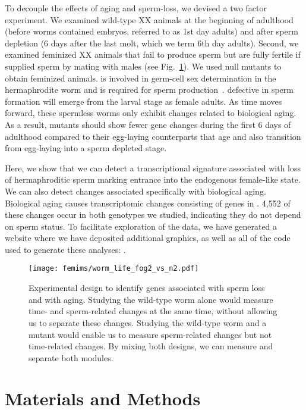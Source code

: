 To decouple the effects of aging and sperm-loss, we devised a two factor
experiment. We examined wild-type XX animals at the beginning of adulthood
(before worms contained embryos, referred to as 1st day adults) and after sperm
depletion (6 days after the last molt, which we term 6th day adults). Second, we
examined feminized XX animals that fail to produce sperm but are fully fertile
if supplied sperm by mating with males (see Fig.~\ref{fig:wormlife}). We used
 null mutants to obtain feminized animals.  is involved in
germ-cell sex determination in the hermaphrodite worm and is required for sperm
production~\citep{Schedl1988,Clifford2000}. \cel{} defective in sperm formation
will emerge from the larval stage as female adults. As time moves forward, these
spermless worms only exhibit changes related to biological aging. As a result,
\fog{} mutants should show fewer gene changes during the first 6 days of
adulthood compared to their egg-laying counterparts that age and also transition
from egg-laying into a sperm depleted stage.

Here, we show that we can detect a transcriptional signature associated
with loss of hermaphroditic sperm marking entrance into the endogenous
female-like state. We can also detect changes associated specifically with
biological aging. Biological aging causes transcriptomic changes consisting of
\agen{} genes in \cel{}. 4,552 of these changes occur in both genotypes we
studied, indicating they do not depend on sperm status. To facilitate
exploration of the data, we have generated a website where we have deposited
additional graphics, as well as all of the code used to generate these analyses:
\website{}.

\begin{figure}[htbp]
  \renewcommand{\familydefault}{\sfdefault}\normalfont{}
  \centering
  \texttt{[image: femims/worm\_life\_fog2\_vs\_n2.pdf]}
    \caption{
    Experimental design to identify genes associated with sperm loss and with
    aging. Studying the wild-type worm alone would measure time- and
    sperm-related changes at the same time, without allowing us to separate
    these changes. Studying the wild-type worm and a \fog{} mutant would enable
    us to measure sperm-related changes but not time-related changes. By mixing
    both designs, we can measure and separate both modules.
  }%
\label{fig:wormlife}
\end{figure}


\section*{Materials and Methods}
\label{sec:materials_methods}

